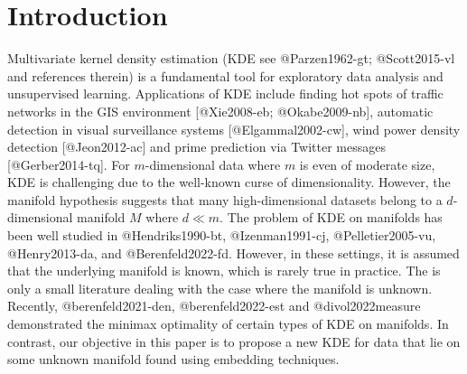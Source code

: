 \documentclass[
]{article}
\author{}
\date{\vspace{-2.5em}}
\begin{document}
\hypertarget{dckdeintro}{%
\section{Introduction}\label{dckdeintro}}

Multivariate kernel density estimation (KDE see @Parzen1962-gt;
@Scott2015-vl and references therein) is a fundamental tool for
exploratory data analysis and unsupervised learning. Applications of KDE
include finding hot spots of traffic networks in the GIS environment
{[}@Xie2008-eb; @Okabe2009-nb{]}, automatic detection in visual
surveillance systems {[}@Elgammal2002-cw{]}, wind power density
detection {[}@Jeon2012-ac{]} and prime prediction via Twitter messages
{[}@Gerber2014-tq{]}. For \(m\)-dimensional data where \(m\) is even of
moderate size, KDE is challenging due to the well-known curse of
dimensionality. However, the manifold hypothesis suggests that many
high-dimensional datasets belong to a \(d\)-dimensional manifold \(M\)
where \(d\ll m\). The problem of KDE on manifolds has been well studied
in @Hendriks1990-bt, @Izenman1991-cj, @Pelletier2005-vu, @Henry2013-da,
and @Berenfeld2022-fd. However, in these settings, it is assumed that
the underlying manifold is known, which is rarely true in practice. The
is only a small literature dealing with the case where the manifold is
unknown. Recently, @berenfeld2021-den, @berenfeld2022-est and
@divol2022measure demonstrated the minimax optimality of certain types
of KDE on manifolds. In contrast, our objective in this paper is to
propose a new KDE for data that lie on some unknown manifold found using
embedding techniques.
\end{document}
